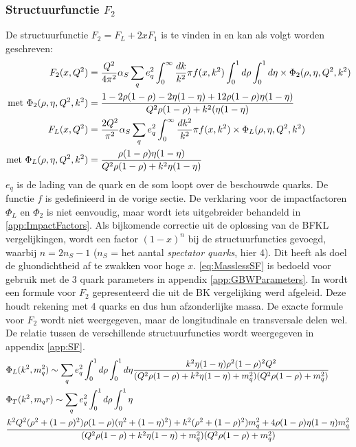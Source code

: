 \documentclass[a4paper,11pt]{article}
\numberwithin{equation}{section} %
\begin{document}
    \subsubsection{Structuurfunctie $F_2$} \label{sec:SF}
De structuurfunctie $F_2 = F_L + 2x F_1$ is te vinden in \cite[vgl. 9.200]{Barone} en kan als volgt worden geschreven:
\begin{align} \label{eq:MasslessSF}
F_2(x,Q^2) &= \frac{Q^2}{4\pi^2} \alpha_S \sum_q e_q^2 \int_0^\infty \frac{dk}{k^2}\pi f(x,k^2) \int_0^1 d\rho \int_0^1 d\eta \times \Phi_2(\rho, \eta, Q^2, k^2) \\
\text{met } \Phi_2(\rho, \eta, Q^2, k^2) &= \frac{1-2\rho(1-\rho)-2\eta(1-\eta)+12\rho(1-\rho)\eta(1-\eta)}{Q^2 \rho(1-\rho) + k^2 (\eta(1-\eta)}\notag \\
F_L(x,Q^2) &= \frac{2 Q^2}{\pi^2} \alpha_S \sum_q e_q^2 \int_0^\infty \frac{dk^2}{k^2} \pi f(x,k^2) \times \Phi_L(\rho, \eta, Q^2, k^2) \\
\text{met } \Phi_L(\rho, \eta, Q^2, k^2) &= \frac{\rho(1-\rho)\eta(1-\eta)}{Q^2 \rho(1-\rho)+k^2 \eta(1-\eta)} \notag
\end{align}
$e_q$ is de lading van de quark en de som loopt over de beschouwde quarks.
De functie $f$ is gedefinieerd in de vorige sectie.
De verklaring voor de impactfactoren $\Phi_L$ en $\Phi_2$ is niet eenvoudig, maar wordt iets uitgebreider behandeld in \ref{app:ImpactFactors}.
Als bijkomende correctie uit de oplossing van de BFKL vergelijkingen, wordt een factor $(1-x)^{n}$ bij de structuurfuncties gevoegd, waarbij $n = 2 n_S -1$ ($n_S$ = het aantal \textit{spectator quarks}, hier 4).
Dit heeft als doel de gluondichtheid af te zwakken voor hoge $x$.
\eqref{eq:MasslessSF} is bedoeld voor gebruik met de 3 quark parameters in appendix \ref{app:GBWParameters}.
In \cite{Bondarenko} wordt een formule voor $F_2$ gepresenteerd die uit de BK vergelijking werd afgeleid.
Deze houdt rekening met 4 quarks en dus hun afzonderlijke massa.
De exacte formule voor $F_2$ wordt niet weergegeven, maar de longitudinale en transversale delen wel.
De relatie tussen de verschillende structuurfuncties wordt weergegeven in appendix \ref{app:SF}.
\begin{align} \label{eq:MassiveSF}
&\Phi_L(k^2, m_q^2) \sim \sum_q e_q^2 \int_0^1 d\rho \int_0^1 d\eta \frac{k^2 \eta(1-\eta)\rho^2(1-\rho)^2 Q^2}{(Q^2\rho(1-\rho)+k^2\eta(1-\eta)+m_q^2)(Q^2\rho(1-\rho)+m_q^2)} \\
&\Phi_T(k^2, m_q^^2) \sim \sum_q e_q^2 \int_0^1 d\rho \int_0^1 \eta \notag \\
&\frac{k^2 Q^2 (\rho^2+(1-\rho)^2)\rho(1-\rho)(\eta^2+(1-\eta)^2)+k^2(\rho^2+(1-\rho)^2)m_q^2 + 4\rho(1-\rho)\eta(1-\eta)m_q^2}{(Q^2\rho(1-\rho)+k^2\eta(1-\eta)+m_q^2)(Q^2\rho(1-\rho)+m_q^2)} \label{eq:MassiveSF2}
\end{align}
\end{document}
